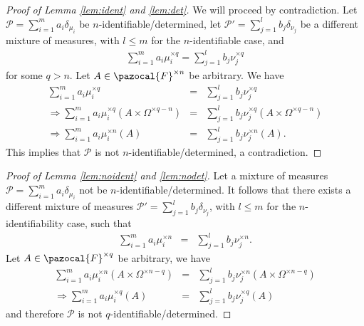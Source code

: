 \documentclass[aos,preprint]{imsart}
\def\sF{\pazocal{F}}
\def\sP{\mathscr{P}}
\theoremstyle{plain}
\theoremstyle{defintion}
\begin{document}
	\begin{proof}[Proof of Lemma \ref{lem:ident} and \ref{lem:det}]
		We will proceed by contradiction. Let $\sP = \sum_{i=1}^m a_i \delta_{\mu_i}$ be $n$-identifiable/determined, let $\sP' = \sum_{j=1}^l b_j \delta_{\nu_j}$ be a different mixture of measures, with $l\le m$ for the $n$-identifiable case, and 
		\begin{eqnarray*}
			\sum_{i=1}^m a_i \mu_i^{\times q} = \sum_{j=1}^l b_j \nu_j^{\times q}
		\end{eqnarray*}
		for some $q>n$. Let $A \in \sF^{\times n}$ be arbitrary. We have
		\begin{eqnarray*}
			\sum_{i=1}^m a_i \mu_i^{\times q} &=& \sum_{j=1}^l b_j \nu_j^{\times q}\\
			\Rightarrow \sum_{i=1}^m a_i \mu_i^{\times q}\left( A\times \Omega^{\times q-n} \right) &=& \sum_{j=1}^l b_j \nu_j^{\times q}\left( A\times \Omega^{\times q-n} \right)\\
			\Rightarrow \sum_{i=1}^m a_i \mu_i^{\times n}\left( A \right) &=& \sum_{j=1}^l b_j \nu_j^{\times n}\left( A  \right).
		\end{eqnarray*}
		This implies that $\sP$ is not $n$-identifiable/determined, a contradiction.
	\end{proof}
	\begin{proof}[Proof of Lemma \ref{lem:noident} and \ref{lem:nodet}]
		Let a mixture of measures $\sP = \sum_{i=1}^m a_i \delta_{\mu_i}$ not be $n$-identifiable/determined. It follows that there exists a different mixture of measures $\sP' = \sum_{j=1}^l b_j \delta_{\nu_j}$, with $l\le m$ for the $n$-identifiability case, such that
		\begin{eqnarray*}
			\sum_{i=1}^m a_i \mu_i^{\times n} &=& \sum_{j=1}^l b_j \nu_j^{\times n}.
		\end{eqnarray*}
		Let $A \in \sF^{\times q}$ be arbitrary, we have
		\begin{eqnarray*}
			\sum_{i=1}^m a_i \mu_i^{\times n}\left( A\times \Omega^{\times n-q} \right) &=& \sum_{j=1}^l b_j \nu_j^{\times n}\left( A\times \Omega^{\times n-q} \right)\\
			\Rightarrow \sum_{i=1}^m a_i \mu_i^{\times q}\left( A  \right) &=& \sum_{j=1}^l b_j \nu_j^{\times q}\left( A \right)
		\end{eqnarray*}
		and therefore $\sP$ is not $q$-identifiable/determined.
	\end{proof}
\end{document}
